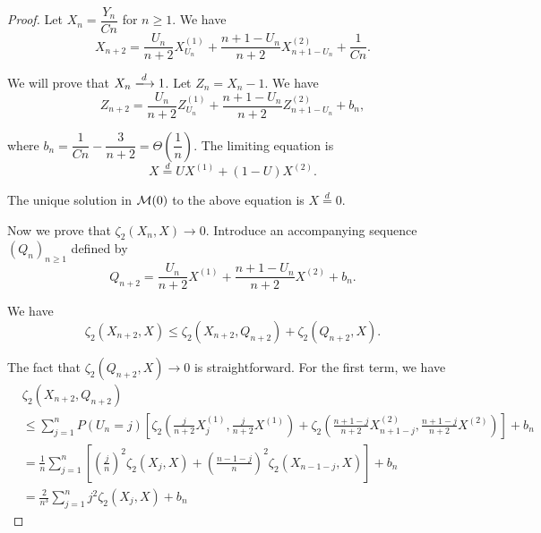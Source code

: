 \begin{proof}
  Let $X_n = \dfrac{Y_n}{Cn}$ for $n \ge 1$. We have
  \begin{equation}
    X_{n+2} = \dfrac{U_n}{n+2} X^{(1)}_{U_n} + \dfrac{n+1-U_n}{n+2} X^{(2)}_{n+1-U_n} + \dfrac{1}{Cn}.
  \end{equation}

  We will prove that $X_n\xlongrightarrow{d} 1$. Let $Z_n = X_n - 1$. We have
  $$Z_{n+2} = \dfrac{U_n}{n+2} Z^{(1)}_{U_n} + \dfrac{n+1-U_n}{n+2} Z^{(2)}_{n+1-U_n} + b_n,$$

  where $b_n = \dfrac{1}{Cn} - \dfrac{3}{n+2} = \Theta\left(\dfrac{1}{n}\right)$. The limiting equation is
  \begin{equation}
    X \stackrel{d}{=} U X^{(1)} + (1-U) X^{(2)}.
  \end{equation}

  \begin{lemma}
    The unique solution in $\mathcal{M}(0)$ to the above equation is $X \stackrel{d}{=} 0$.
  \end{lemma}

  Now we prove that $\zeta_2(X_n, X) \to 0$. Introduce an accompanying sequence $(Q_n)_{n \ge 1}$ defined by
  \begin{equation}
    Q_{n+2} = \dfrac{U_n}{n+2}X^{(1)} + \dfrac{n+1-U_n}{n+2}X^{(2)} + b_n.
  \end{equation}

  We have
  $$\zeta_2(X_{n+2}, X) \le \zeta_2(X_{n+2}, Q_{n+2}) + \zeta_2(Q_{n+2}, X).$$

  The fact that $\zeta_2(Q_{n+2}, X) \to 0$ is straightforward. For the first term, we have
  \begin{align*}
     & \zeta_2(X_{n+2}, Q_{n+2})                                                                                                                                                                                \\
     & \le \sum_{j=1}^{n} P(U_n = j) \left[ \zeta_2\left( \frac{j}{n+2}X^{(1)}_j, \frac{j}{n+2}X^{(1)} \right) + \zeta_2\left( \frac{n+1-j}{n+2}X^{(2)}_{n+1-j}, \frac{n+1-j}{n+2}X^{(2)} \right) \right] + b_n \\
     & = \frac{1}{n} \sum_{j=1}^{n} \left[ \left(\frac{j}{n}\right)^2 \zeta_2(X_j, X) + \left(\frac{n-1-j}{n}\right)^2 \zeta_2(X_{n-1-j}, X) \right] + b_n                                                      \\
     & = \frac{2}{n^3} \sum_{j=1}^{n} j^2 \zeta_2(X_j, X)      + b_n
  \end{align*}


\end{proof}
